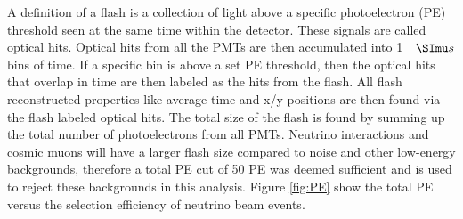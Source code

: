 A definition of a flash is a collection of light above a specific photoelectron (PE) threshold seen at the same time within the detector. These signals are called optical hits. Optical hits from all the PMTs are then accumulated into 1 $\micro s$ bins of time. If a specific bin is above a set PE threshold, then the optical hits that overlap in time are then labeled as the hits from the flash. All flash reconstructed properties like average time and x/y positions are then found via the flash labeled optical hits. The total size of the flash is found by summing up the total number of photoelectrons from all PMTs. Neutrino interactions and cosmic muons will have a larger flash size compared to noise and other low-energy backgrounds, therefore a total PE cut of 50 PE was deemed sufficient and is used to reject these backgrounds in this analysis. Figure \ref{fig:PE} show the total PE versus the selection efficiency of neutrino beam events. 


